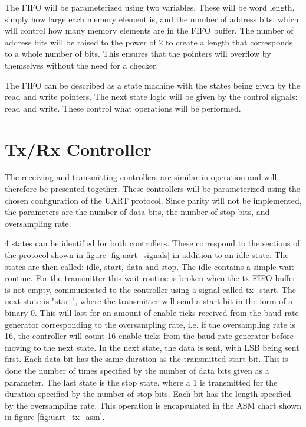 \documentclass[./dissertation.tex]{subfiles}
\begin{document}
The FIFO will be parameterized using two variables. These will be word length, simply how large each memory element is, and the number of address bits, which will control how many memory elements are in the FIFO buffer. The number of address bits will be raised to the power of 2 to create a length that corresponds to a whole number of bits. This ensures that the pointers will overflow by themselves without the need for a checker. 

The FIFO can be described as a state machine with the states being given by the read and write pointers. The next state logic will be given by the control signals: read and write. These control what operations will be performed. 

\section{Tx/Rx Controller}
The receiving and transmitting controllers are similar in operation and will therefore be presented together. These controllers will be parameterized using the chosen configuration of the UART protocol. Since parity will not be implemented, the parameters are the number of data bits, the number of stop bits, and oversampling rate.

4 states can be identified for both controllers. These correspond to the sections of the protocol shown in figure \ref{fig:uart_signals} in addition to an idle state. The states are then called: idle, start, data and stop. The idle contains a simple wait routine. For the transmitter this wait routine is broken when the tx FIFO buffer is not empty, communicated to the controller using a signal called tx\_start. The next state is "start", where the transmitter will send a start bit in the form of a binary 0. This will last for an amount of enable ticks received from the baud rate generator corresponding to the oversampling rate, i.e. if the oversampling rate is 16, the controller will count 16 enable ticks from the baud rate generator before moving to the next state. In the next state, the data is sent, with LSB being sent first. Each data bit has the same duration as the transmitted start bit. This is done the number of times specified by the number of data bits given as a parameter. The last state is the stop state, where a 1 is transmitted for the duration specified by the number of stop bits. Each bit has the length specified by the oversampling rate. This operation is encapsulated in the ASM chart shown in figure \ref{fig:uart_tx_asm}.
\end{document}
